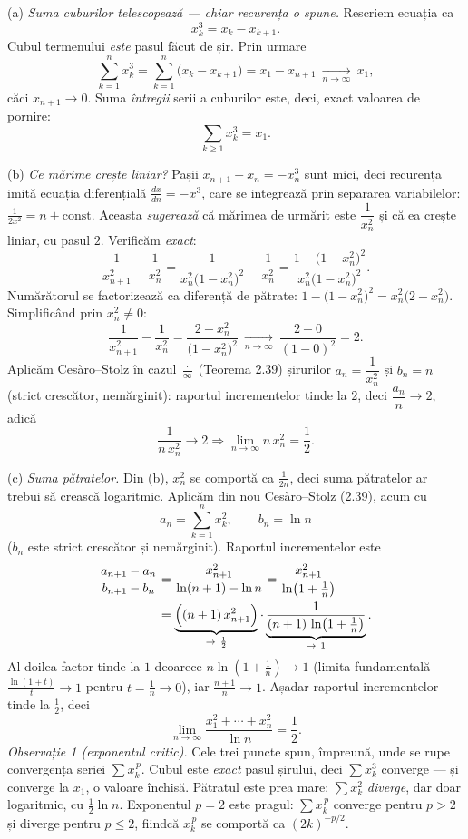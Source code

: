 (a) \emph{Suma cuburilor telescopează --- chiar recurența o spune.} Rescriem ecuația ca
\[ x_{k}^{3}=x_{k}-x_{k+1} . \]
Cubul termenului \emph{este} pasul făcut de șir. Prin urmare
\[ \sum_{k=1}^{n}x_{k}^{3}=\sum_{k=1}^{n}\bigl(x_{k}-x_{k+1}\bigr)=x_{1}-x_{n+1}\ \xrightarrow[n\to\infty]{}\ x_{1} , \]
căci $x_{n+1}\to0$. Suma \emph{întregii} serii a cuburilor este, deci, exact valoarea de pornire:
\[ \sum_{k\ge1}x_{k}^{3}=x_{1} . \]

(b) \emph{Ce mărime crește liniar?} Pașii $x_{n+1}-x_{n}=-x_{n}^{3}$ sunt mici, deci recurența imită ecuația diferențială $\frac{dx}{dn}=-x^{3}$, care se integrează prin separarea variabilelor: $\frac{1}{2x^{2}}=n+\text{const}$. Aceasta \emph{sugerează} că mărimea de urmărit este $\dfrac{1}{x_{n}^{2}}$ și că ea crește liniar, cu pasul $2$. Verificăm \emph{exact}:
\[ \frac{1}{x_{n+1}^{2}}-\frac{1}{x_{n}^{2}}=\frac{1}{x_{n}^{2}\bigl(1-x_{n}^{2}\bigr)^{2}}-\frac{1}{x_{n}^{2}}=\frac{1-\bigl(1-x_{n}^{2}\bigr)^{2}}{x_{n}^{2}\bigl(1-x_{n}^{2}\bigr)^{2}} . \]
Numărătorul se factorizează ca diferență de pătrate: $1-\bigl(1-x_{n}^{2}\bigr)^{2}=x_{n}^{2}\bigl(2-x_{n}^{2}\bigr)$. Simplificând prin $x_{n}^{2}\neq0$:
\[ \frac{1}{x_{n+1}^{2}}-\frac{1}{x_{n}^{2}}=\frac{2-x_{n}^{2}}{\bigl(1-x_{n}^{2}\bigr)^{2}}\ \xrightarrow[n\to\infty]{}\ \frac{2-0}{(1-0)^{2}}=2 . \]
Aplicăm Cesàro--Stolz în cazul $\frac{\cdot}{\infty}$ (Teorema 2.39) șirurilor $a_{n}=\dfrac{1}{x_{n}^{2}}$ și $b_{n}=n$ (strict crescător, nemărginit): raportul incrementelor tinde la $2$, deci $\dfrac{a_{n}}{n}\to2$, adică
\[ \frac{1}{n\,x_{n}^{2}}\to2 \Longrightarrow \lim_{n\to\infty}n\,x_{n}^{2}=\frac12 . \]

(c) \emph{Suma pătratelor.} Din (b), $x_{n}^{2}$ se comportă ca $\frac{1}{2n}$, deci suma pătratelor ar trebui să crească logaritmic. Aplicăm din nou Cesàro--Stolz (2.39), acum cu
\[ a_{n}=\sum_{k=1}^{n}x_{k}^{2},\qquad b_{n}=\ln n \]
($b_{n}$ este strict crescător și nemărginit). Raportul incrementelor este
\[ \begin{aligned} \frac{a_{n+1}-a_{n}}{b_{n+1}-b_{n}}&=\frac{x_{n+1}^{2}}{\ln(n+1)-\ln n}=\frac{x_{n+1}^{2}}{\ln\!\left(1+\frac1n\right)}\\ &=\underbrace{\Bigl((n+1)\,x_{n+1}^{2}\Bigr)}_{\to\ \frac12}\cdot\underbrace{\frac{1}{(n+1)\,\ln\!\left(1+\frac1n\right)}}_{\to\ 1} . \end{aligned} \]
Al doilea factor tinde la $1$ deoarece $n\ln\!\left(1+\frac1n\right)\to1$ (limita fundamentală $\frac{\ln(1+t)}{t}\to1$ pentru $t=\frac1n\to0$), iar $\frac{n+1}{n}\to1$. Așadar raportul incrementelor tinde la $\frac12$, deci
\[ \lim_{n\to\infty}\frac{x_{1}^{2}+\cdots+x_{n}^{2}}{\ln n}=\frac12 . \]
\emph{Observație 1 (exponentul critic).} Cele trei puncte spun, împreună, unde se rupe convergența seriei $\sum x_{k}^{\,p}$. Cubul este \emph{exact} pasul șirului, deci $\sum x_{k}^{3}$ converge --- și converge la $x_{1}$, o valoare închisă. Pătratul este prea mare: $\sum x_{k}^{2}$ \emph{diverge}, dar doar logaritmic, cu $\frac12\ln n$. Exponentul $p=2$ este pragul: $\sum x_{k}^{\,p}$ converge pentru $p>2$ și diverge pentru $p\le2$, fiindcă $x_{k}^{\,p}$ se comportă ca $(2k)^{-p/2}$.

